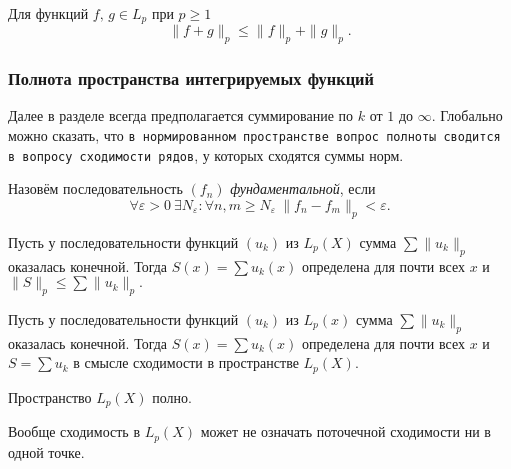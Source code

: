 \begin{to_thr}
    Для функций $f, \, g \in L_p$ при $p \geq 1$
    \begin{equation*}
        \|f + g\|_p \leq \|f\|_p + \|g\|_p.
    \end{equation*}
\end{to_thr}



\subsubsection*{Полнота пространства интегрируемых функций}

Далее в разделе всегда предполагается суммирование по $k$ от $1$ до $\infty$. Глобально можно сказать, что \texttt{в нормированном пространстве вопрос полноты сводится в вопросу сходимости рядов}, у которых сходятся суммы норм. 

\begin{to_def}
    Назовём последовательность $(f_n)$ \textit{фундаментальной}, если
    \begin{equation*}
        \forall \varepsilon > 0 \ 
        \exists N_\varepsilon \colon 
        \forall n, m \geq N_\varepsilon \
        \|f_n - f_m\|_p < \varepsilon.
    \end{equation*}
\end{to_def}

\begin{to_lem}
    Пусть у последовательности функций $(u_k)$ из $L_p (X)$ сумма
    $\sum \|u_k\|_p$
    оказалась конечной. Тогда $S(x) = \sum u_k (x)$ определена для почти всех $x$ и
    $\|S\|_p \leq \sum \|u_k\|_p.$
\end{to_lem}


\begin{to_lem}
    Пусть у последовательности функций $(u_k)$ из $L_p (x)$ сумма
    $\sum \|u_k\|_p$
    оказалась конечной. Тогда $S(x) = \sum u_k (x)$ определена для почти всех $x$ и
    $S = \sum u_k$
    в смысле сходимости в пространстве $L_p (X)$.
\end{to_lem}


\begin{to_thr}[]
    Пространство $L_p (X)$ полно.
\end{to_thr}



Вообще сходимость в $L_p (X)$ может не означать поточечной сходимости ни в одной точке.